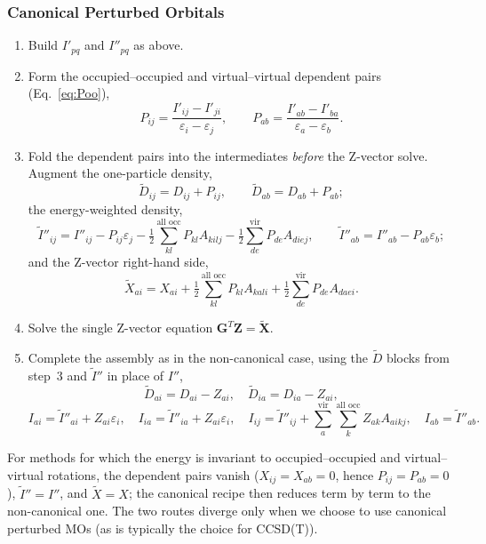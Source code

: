 \documentclass[12pt]{article}
\newcommand{\vir}{\text{vir}}
\newcommand{\alloc}{\text{all occ}}   %
\begin{document}
\subsubsection{Canonical Perturbed Orbitals}
\begin{enumerate}
\item Build $I'_{pq}$ and $I''_{pq}$ as above.
\item Form the occupied--occupied and virtual--virtual dependent pairs
(Eq.~\eqref{eq:Poo}),
\begin{equation*}
P_{ij}=\frac{I'_{ij}-I'_{ji}}{\varepsilon_i-\varepsilon_j},\qquad
P_{ab}=\frac{I'_{ab}-I'_{ba}}{\varepsilon_a-\varepsilon_b}.
\end{equation*}
\item Fold the dependent pairs into the intermediates {\em before} the Z-vector
solve.  Augment the one-particle density,
\begin{equation*}
\tilde{D}_{ij}=D_{ij}+P_{ij},\qquad \tilde{D}_{ab}=D_{ab}+P_{ab};
\end{equation*}
the energy-weighted density,
\begin{equation*}
\tilde{I}''_{ij} = I''_{ij} - P_{ij}\varepsilon_j
- \tfrac12\sum_{kl}^{\alloc}P_{kl}A_{kilj}
- \tfrac12\sum_{de}^{\vir}P_{de}A_{diej},
\qquad
\tilde{I}''_{ab} = I''_{ab} - P_{ab}\varepsilon_b;
\end{equation*}
and the Z-vector right-hand side,
\begin{equation*}
\tilde{X}_{ai} = X_{ai}
+ \tfrac12\sum_{kl}^{\alloc}P_{kl}A_{kali}
+ \tfrac12\sum_{de}^{\vir}P_{de}A_{daei}.
\end{equation*}
\item Solve the single Z-vector equation
$\mathbf{G}^{T}\mathbf{Z}=\tilde{\mathbf{X}}$.
\item Complete the assembly as in the non-canonical case, using the $\tilde{D}$
blocks from step~3 and $\tilde{I}''$ in place of $I''$,
\begin{equation*}
\tilde{D}_{ai}=D_{ai}-Z_{ai},\quad \tilde{D}_{ia}=D_{ia}-Z_{ai},
\end{equation*}
\begin{equation*}
I_{ai}=\tilde{I}''_{ai}+Z_{ai}\varepsilon_i,\quad
I_{ia}=\tilde{I}''_{ia}+Z_{ai}\varepsilon_i,\quad
I_{ij}=\tilde{I}''_{ij}+\sum_{a}^{\vir}\sum_{k}^{\alloc} Z_{ak}A_{aikj},\quad
I_{ab}=\tilde{I}''_{ab}.
\end{equation*}
\end{enumerate}

For methods for which the energy is invariant to occupied--occupied and virtual--virtual
rotations, the dependent pairs vanish ($X_{ij}=X_{ab}=0$, hence
$P_{ij}=P_{ab}=0$), $\tilde{I}''=I''$, and $\tilde{X}=X$; the canonical recipe
then reduces term by term to the non-canonical one.  The two routes diverge only
when we choose to use canonical perturbed MOs (as is typically the choice for
CCSD(T)).
\end{document}
